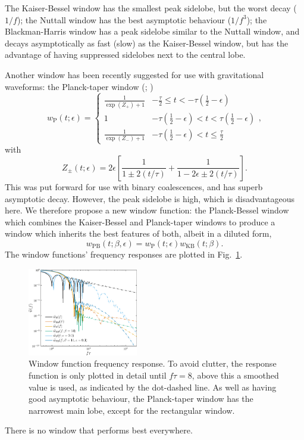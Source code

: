 \documentclass[useAMS,usedcolumn,usegraphicx,usenatbib]{mn2e}
\newcommand{\figref}[1]{Fig.~\ref{fig:#1}}
\newcommand{\sub}[1]{\ensuremath{_\mathrm{#1}}}
\newcommand{\recip}[1]{\ensuremath{\frac{1}{#1}}}
\begin{document}
The Kaiser-Bessel window has the smallest peak sidelobe, but the worst decay ($1/f$); the Nuttall window has the best asymptotic behaviour ($1/f^3$); the Blackman-Harris window has a peak sidelobe similar to the Nuttall window, and decays asymptotically as fast (slow) as the Kaiser-Bessel window, but has the advantage of having suppressed sidelobes next to the central lobe.

Another window has been recently suggested for use with gravitational waveforms: the Planck-taper window (\citealt*{Damour2000}; \citealt{McKechan2010})
\begin{equation}
w\sub{P}(t; \epsilon) = \begin{cases}
 {\displaystyle \recip{\exp(Z_+)+1}} & {\displaystyle -\frac{\tau}{2} \leq t < -\tau\left(\recip{2} - \epsilon\right)} \\
 1 & {\displaystyle -\tau\left(\recip{2} - \epsilon\right) < t < \tau\left(\recip{2} - \epsilon\right)} \\
 {\displaystyle \recip{\exp(Z_-)+1}} & {\displaystyle -\tau\left(\recip{2} - \epsilon\right) < t \leq \frac{\tau}{2}}
\end{cases},
\end{equation}
with
\begin{equation}
Z_\pm(t; \epsilon) = 2\epsilon\left[\recip{1 \pm 2(t/\tau)} + \recip{1 - 2\epsilon \pm 2(t/\tau)}\right].
\end{equation}
This was put forward for use with binary coalescences, and has superb asymptotic decay. However, the peak sidelobe is high, which is disadvantageous here. We therefore propose a new window function: the Planck-Bessel window which combines the Kaiser-Bessel and Planck-taper windows to produce a window which inherits the best features of both, albeit in a diluted form,
\begin{equation}
w\sub{PB}(t;\beta,\epsilon) = w\sub{P}(t; \epsilon)w\sub{KB}(t;\beta).
\end{equation}
The window functions' frequency responses are plotted in \figref{Response}.
\begin{figure}
  \begin{center}
  \includegraphics[width=0.43\textwidth]{Fig_Response}
    \caption{Window function frequency response. To avoid clutter, the response function is only plotted in detail until $f\tau = 8$, above this a smoothed value is used, as indicated by the dot-dashed line. As well as having good asymptotic behaviour, the Planck-taper window has the narrowest main lobe, except for the rectangular window.}
    \label{fig:Response}
  \end{center}
\end{figure}
There is no window that performs best everywhere.
\end{document}
